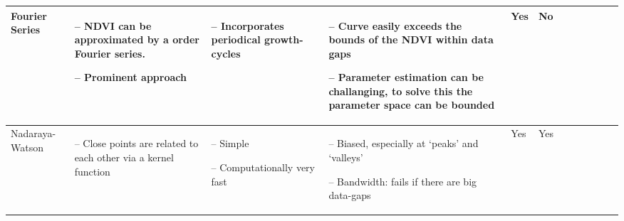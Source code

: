 \begin{table}[!ht]
\begin{tabular}{p{1.6cm}p{3.3cm}p{3.3cm}p{3.4cm}p{0.4cm}p{0.4cm}p{3cm}p{3cm}p{3cm}p{3cm}p{2.7cm}p{3cm}|}
		Fourier Series                                                                                                                                              &
		\begin{cptitemize} \item[--]  NDVI can be approximated by a \nth{2} order Fourier series.      \item[--] Prominent approach                      \end{cptitemize}        &
		\begin{cptitemize} \item[--]  Incorporates periodical growth-cycles                                 \end{cptitemize}        &
		\begin{cptitemize}  \item[--]  Curve easily exceeds the bounds of the NDVI within data gaps    \item[--]  Parameter estimation can be challanging, to solve this the parameter space can be bounded        \end{cptitemize}        &
		Yes                                                                                                                                                          &
		No                                                                                                                                                         \\ \hline%

		Nadaraya-Watson                                                                                                                            &
		\begin{cptitemize} \item[--]  Close points are related to each other via a kernel function \end{cptitemize}                                                                                                                                                            &
		\begin{cptitemize} \item[--]  Simple  \item[--]  Computationally very fast                                                             \end{cptitemize}        &
		\begin{cptitemize} \item[--]  Biased, especially at `peaks' and `valleys'   \item[--]  Bandwidth: fails if there are big data-gaps                                                     \end{cptitemize}               &
		Yes                                                                                                                                                          &
		Yes                                                                                                                                                            \\ \hline%


\end{tabular}
\end{table}
